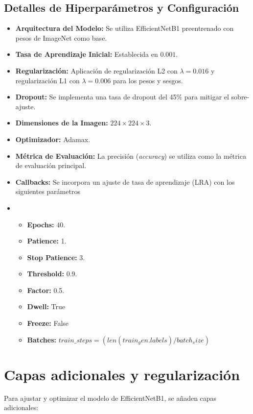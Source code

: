\subsection*{Detalles de Hiperparámetros y Configuración}

\begin{itemize}
   \item \textbf{Arquitectura del Modelo:} Se utiliza EfficientNetB1 preentrenado con pesos de ImageNet como base.
   \item \textbf{Tasa de Aprendizaje Inicial:} Establecida en $0.001$.
   \item \textbf{Regularización:} Aplicación de regularización L2 con $\lambda = 0.016$ y regularización L1 con $\lambda = 0.006$ para los pesos y sesgos.
   \item \textbf{Dropout:} Se implementa una tasa de dropout del 45\% para mitigar el sobre-ajuste.
   \item \textbf{Dimensiones de la Imagen:} $224 \times 224 \times 3$.
   \item \textbf{Optimizador:} Adamax.
   \item \textbf{Métrica de Evaluación:} La precisión (\textit{accuracy}) se utiliza como la métrica de evaluación principal.
   \item \textbf{Callbacks:} Se incorpora un ajuste de tasa de aprendizaje (LRA) con los siguientes parámetros
   \item \begin{itemize}
      \item \textbf{Epochs:} $40$.
      \item \textbf{Patience:} 1.      
      \item \textbf{Stop Patience:} 3.
      \item \textbf{Threshold:}  0.9.
      \item \textbf{Factor:} 0.5.      
      \item \textbf{Dwell:} True
      \item \textbf{Freeze:} False  
      \item \textbf{Batches:} $train\_steps = (len(train_gen.labels)/batch_size)$
   \end{itemize}
\end{itemize}

\section{Capas adicionales y regularización}
   
   Para ajustar y optimizar el modelo de EfficientNetB1, se añaden capas adicionales:
   
